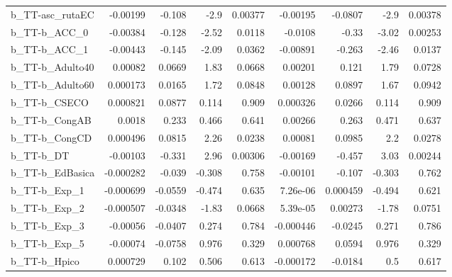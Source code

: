 \begin{tabular}{lrrrrrrrr}
b\_TT-asc\_rutaEC            &    -0.00199 &       -0.108 &      -2.9 &  0.00377 &   -0.00195 &     -0.0807 &         -2.9 &       0.00378 \\
b\_TT-b\_ACC\_0               &    -0.00384 &       -0.128 &     -2.52 &   0.0118 &    -0.0108 &       -0.33 &        -3.02 &       0.00253 \\
b\_TT-b\_ACC\_1               &    -0.00443 &       -0.145 &     -2.09 &   0.0362 &   -0.00891 &      -0.263 &        -2.46 &        0.0137 \\
b\_TT-b\_Adulto40            &     0.00082 &       0.0669 &      1.83 &   0.0668 &    0.00201 &       0.121 &         1.79 &        0.0728 \\
b\_TT-b\_Adulto60            &    0.000173 &       0.0165 &      1.72 &   0.0848 &    0.00128 &      0.0897 &         1.67 &        0.0942 \\
b\_TT-b\_CSECO               &    0.000821 &       0.0877 &     0.114 &    0.909 &   0.000326 &      0.0266 &        0.114 &         0.909 \\
b\_TT-b\_CongAB              &      0.0018 &        0.233 &     0.466 &    0.641 &    0.00266 &       0.263 &        0.471 &         0.637 \\
b\_TT-b\_CongCD              &    0.000496 &       0.0815 &      2.26 &   0.0238 &    0.00081 &      0.0985 &          2.2 &        0.0278 \\
b\_TT-b\_DT                  &    -0.00103 &       -0.331 &      2.96 &  0.00306 &   -0.00169 &      -0.457 &         3.03 &       0.00244 \\
b\_TT-b\_EdBasica            &   -0.000282 &       -0.039 &    -0.308 &    0.758 &   -0.00101 &      -0.107 &       -0.303 &         0.762 \\
b\_TT-b\_Exp\_1               &   -0.000699 &      -0.0559 &    -0.474 &    0.635 &   7.26e-06 &    0.000459 &       -0.494 &         0.621 \\
b\_TT-b\_Exp\_2               &   -0.000507 &      -0.0348 &     -1.83 &   0.0668 &   5.39e-05 &     0.00273 &        -1.78 &        0.0751 \\
b\_TT-b\_Exp\_3               &    -0.00056 &      -0.0407 &     0.274 &    0.784 &  -0.000446 &     -0.0245 &        0.271 &         0.786 \\
b\_TT-b\_Exp\_5               &    -0.00074 &      -0.0758 &     0.976 &    0.329 &   0.000768 &      0.0594 &        0.976 &         0.329 \\
b\_TT-b\_Hpico               &    0.000729 &        0.102 &     0.506 &    0.613 &  -0.000172 &     -0.0184 &          0.5 &         0.617 \\

\end{tabular}
